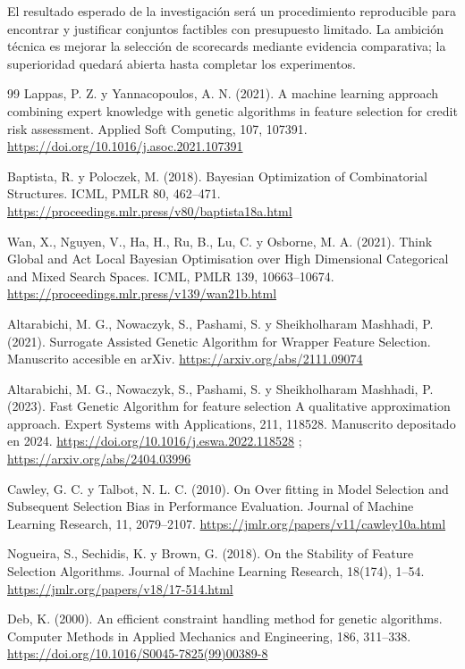 \documentclass[11pt,letterpaper]{article}
\begin{document}
El resultado esperado de la investigación será un procedimiento reproducible para encontrar y justificar conjuntos factibles con presupuesto limitado. La ambición técnica es mejorar la selección de scorecards mediante evidencia comparativa; la superioridad quedará abierta hasta completar los experimentos.


\begin{thebibliography}{99}
 Lappas, P. Z. y Yannacopoulos, A. N. (2021). A machine learning approach combining expert knowledge with genetic algorithms in feature selection for credit risk assessment. Applied Soft Computing, 107, 107391. \url{https://doi.org/10.1016/j.asoc.2021.107391}

 Baptista, R. y Poloczek, M. (2018). Bayesian Optimization of Combinatorial Structures. ICML, PMLR 80, 462--471. \url{https://proceedings.mlr.press/v80/baptista18a.html}

 Wan, X., Nguyen, V., Ha, H., Ru, B., Lu, C. y Osborne, M. A. (2021). Think Global and Act Local Bayesian Optimisation over High Dimensional Categorical and Mixed Search Spaces. ICML, PMLR 139, 10663--10674. \url{https://proceedings.mlr.press/v139/wan21b.html}

 Altarabichi, M. G., Nowaczyk, S., Pashami, S. y Sheikholharam Mashhadi, P. (2021). Surrogate Assisted Genetic Algorithm for Wrapper Feature Selection. Manuscrito accesible en arXiv. \url{https://arxiv.org/abs/2111.09074}

 Altarabichi, M. G., Nowaczyk, S., Pashami, S. y Sheikholharam Mashhadi, P. (2023). Fast Genetic Algorithm for feature selection A qualitative approximation approach. Expert Systems with Applications, 211, 118528. Manuscrito depositado en 2024. \url{https://doi.org/10.1016/j.eswa.2022.118528} ; \url{https://arxiv.org/abs/2404.03996}

 Cawley, G. C. y Talbot, N. L. C. (2010). On Over fitting in Model Selection and Subsequent Selection Bias in Performance Evaluation. Journal of Machine Learning Research, 11, 2079--2107. \url{https://jmlr.org/papers/v11/cawley10a.html}

 Nogueira, S., Sechidis, K. y Brown, G. (2018). On the Stability of Feature Selection Algorithms. Journal of Machine Learning Research, 18(174), 1--54. \url{https://jmlr.org/papers/v18/17-514.html}

 Deb, K. (2000). An efficient constraint handling method for genetic algorithms. Computer Methods in Applied Mechanics and Engineering, 186, 311--338. \url{https://doi.org/10.1016/S0045-7825(99)00389-8}


\end{thebibliography}
\end{document}
